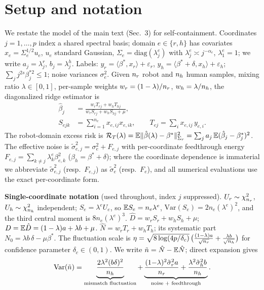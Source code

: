 \section{Setup and notation}
\label{supp:setup}

We restate the model of the main text (Sec.~3) for self-containment.
Coordinates $j = 1,\dots,p$ index a shared spectral basis; domain $e \in \{r, h\}$ has covariates $x_e = \Sigma_e^{1/2} u_e$, $u_e$ standard Gaussian, $\Sigma_e = \mathrm{diag}(\lambda^e_j)$ with $\lambda^e_j \asymp j^{-\alpha_e}$, $\lambda^e_1 = 1$; we write $a_j = \lambda^r_j$, $b_j = \lambda^h_j$.
Labels: $y_r = \langle\beta^*, x_r\rangle + \varepsilon_r$, $y_h = \langle\beta^* + \delta, x_h\rangle + \varepsilon_h$; $\sum_j j^{2s}\beta_j^{*2} \le 1$; noise variances $\sigma_e^2$.
Given $n_r$ robot and $n_h$ human samples, mixing ratio $\lambda \in [0,1]$, per-sample weights $w_r = (1-\lambda)/n_r$, $w_h = \lambda/n_h$, the diagonalized ridge estimator is
\begin{equation}
\begin{aligned}
  \hat\beta_j &= \frac{w_r T_{rj} + w_h T_{hj}}{w_r S_{rj} + w_h S_{hj} + \mu},\\
  S_{ejk} &= {\textstyle\sum_{i=1}^{n_e}} x_{e,ij} x_{e,ik},\qquad
  T_{ej} = {\textstyle\sum_i} x_{e,ij}\, y_{e,i}.
\end{aligned}
  \label{supp:eq:estimator}
\end{equation}
The robot-domain excess risk is $\mathcal{R}_T(\lambda) = \mathbb{E}\|\hat\beta(\lambda) - \beta^*\|^2_{\Sigma_r} = \sum_j a_j\, \mathbb{E}(\hat\beta_j - \beta^*_j)^2$.
The effective noise is $\tilde\sigma_{e,j}^2 = \sigma_e^2 + F_{e,j}$ with per-coordinate feedthrough energy $F_{e,j} = \sum_{k\neq j} \lambda^e_k \beta_{e,k}^2$ ($\beta_h = \beta^* + \delta$); where the coordinate dependence is immaterial we abbreviate $\tilde\sigma_{e,j}^2$ (resp.\ $F_{e,j}$) as $\tilde\sigma_e^2$ (resp.\ $F_e$), and all numerical evaluations use the exact per-coordinate form.

\medskip
\noindent\textbf{Single-coordinate notation} (used throughout, index $j$ suppressed).
$U_r \sim \chi^2_{n_r}$, $U_h \sim \chi^2_{n_h}$ independent; $S_e = \lambda^e U_e$, so $\mathbb{E} S_e = n_e\lambda^e$, $\mathrm{Var}(S_e) = 2n_e(\lambda^e)^2$, and the third central moment is $8n_e(\lambda^e)^3$.
$\hat D = w_r S_r + w_h S_h + \mu$; $D = \mathbb{E}\hat D = (1-\lambda)a + \lambda b + \mu$.
$\hat N = w_r T_{r} + w_h T_{h}$; its systematic part $N_0 = \lambda b\,\delta - \mu\beta^*$.
The fluctuation scale is $\eta = \sqrt{8\log(4p/\delta_c)}\,\big(\frac{(1-\lambda)a}{\sqrt{n_r}} + \frac{\lambda b}{\sqrt{n_h}}\big)$ for confidence parameter $\delta_c \in (0,1)$.
We write $\tilde n = \hat N - \mathbb{E}\hat N$; direct expansion gives
\begin{equation}
  \mathrm{Var}(\tilde n) = \underbrace{\frac{2\lambda^2 (b\delta)^2}{n_h}}_{\text{mismatch fluctuation}} + \underbrace{\frac{(1{-}\lambda)^2 \tilde\sigma_r^2 a}{n_r} + \frac{\lambda^2 \tilde\sigma_h^2 b}{n_h}}_{\text{noise + feedthrough}} .
  \label{supp:eq:varn}
\end{equation}

